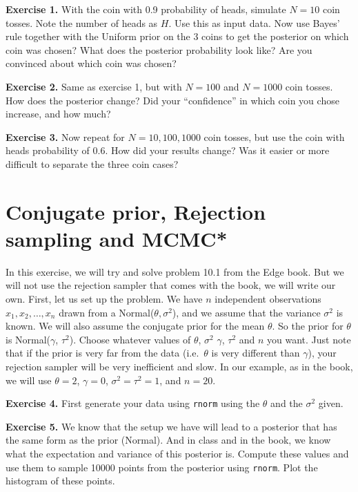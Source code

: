 \documentclass[
]{book}
\begin{document}
\textbf{Exercise 1.} With the coin with 0.9 probability of heads, simulate \(N=10\) coin tosses. Note the number of heads as \(H\). Use this as input data. Now use Bayes' rule together with the Uniform prior on the 3 coins to get the posterior on which coin was chosen? What does the posterior probability look like? Are you convinced about which coin was chosen?

\textbf{Exercise 2.} Same as exercise 1, but with \(N=100\) and \(N=1000\) coin tosses. How does the posterior change? Did your ``confidence'' in which coin you chose increase, and how much?

\textbf{Exercise 3.} Now repeat for \(N=10, 100, 1000\) coin tosses, but use the coin with heads probability of 0.6. How did your results change? Was it easier or more difficult to separate the three coin cases?

\hypertarget{conjugate-prior-rejection-sampling-and-mcmc}{%
\section{Conjugate prior, Rejection sampling and MCMC*}\label{conjugate-prior-rejection-sampling-and-mcmc}}

In this exercise, we will try and solve problem 10.1 from the Edge book. But we will not use the rejection sampler that comes with the book, we will write our own. First, let us set up the problem. We have \(n\) independent observations \(x_1, x_2, \dots, x_n\) drawn from a Normal(\(\theta, \sigma^2\)), and we assume that the variance \(\sigma^2\) is known. We will also assume the conjugate prior for the mean \(\theta\). So the prior for \(\theta\) is Normal(\(\gamma\), \(\tau^2\)). Choose whatever values of \(\theta\), \(\sigma^2\) \(\gamma\), \(\tau^2\) and \(n\) you want. Just note that if the prior is very far from the data (i.e.~\(\theta\) is very different than \(\gamma\)), your rejection sampler will be very inefficient and slow. In our example, as in the book, we will use \(\theta = 2\), \(\gamma=0\), \(\sigma^2 = \tau^2 = 1\), and \(n=20\).

\textbf{Exercise 4.} First generate your data using \texttt{rnorm} using the \(\theta\) and the \(\sigma^2\) given.

\textbf{Exercise 5.} We know that the setup we have will lead to a posterior that has the same form as the prior (Normal). And in class and in the book, we know what the expectation and variance of this posterior is. Compute these values and use them to sample 10000 points from the posterior using \texttt{rnorm}. Plot the histogram of these points.
\end{document}
